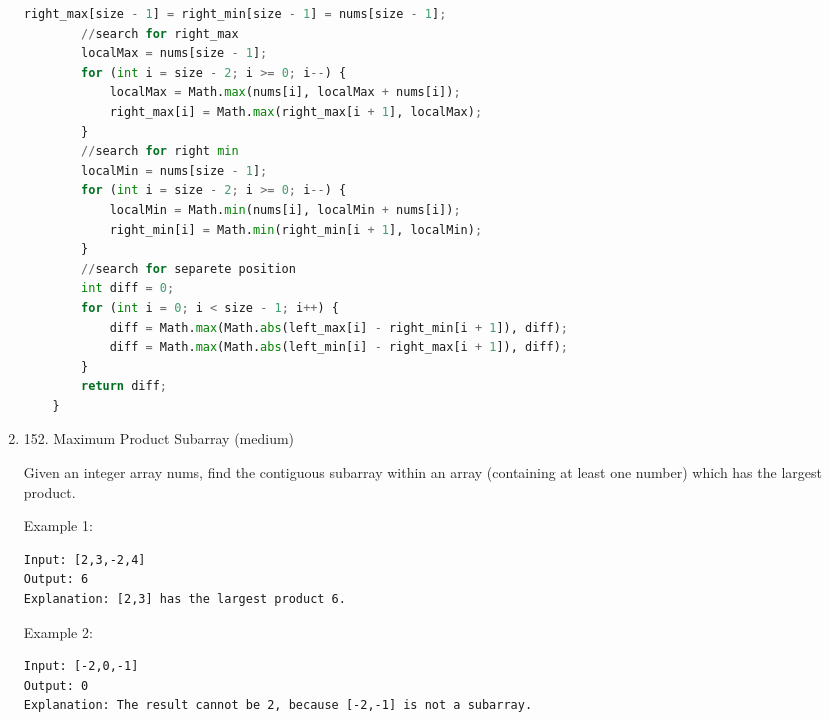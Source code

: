\documentclass[../main.tex]{subfiles}
\begin{document}
\begin{enumerate}
\begin{lstlisting}[language = Python]
        right_max[size - 1] = right_min[size - 1] = nums[size - 1];
        //search for right_max 
        localMax = nums[size - 1];
        for (int i = size - 2; i >= 0; i--) {
            localMax = Math.max(nums[i], localMax + nums[i]);
            right_max[i] = Math.max(right_max[i + 1], localMax);
        }
        //search for right min
        localMin = nums[size - 1];
        for (int i = size - 2; i >= 0; i--) {
            localMin = Math.min(nums[i], localMin + nums[i]);
            right_min[i] = Math.min(right_min[i + 1], localMin);
        }
        //search for separete position 
        int diff = 0;
        for (int i = 0; i < size - 1; i++) {
            diff = Math.max(Math.abs(left_max[i] - right_min[i + 1]), diff);
            diff = Math.max(Math.abs(left_min[i] - right_max[i + 1]), diff);
        }
        return diff;
    }
\end{lstlisting}

\item 152. Maximum Product Subarray (medium)

Given an integer array nums, find the contiguous subarray within an array (containing at least one number) which has the largest product.

Example 1:
\begin{lstlisting}
Input: [2,3,-2,4]
Output: 6
Explanation: [2,3] has the largest product 6.
\end{lstlisting}
Example 2:
\begin{lstlisting}
Input: [-2,0,-1]
Output: 0
Explanation: The result cannot be 2, because [-2,-1] is not a subarray.
\end{lstlisting}


\end{enumerate}
\end{document}
